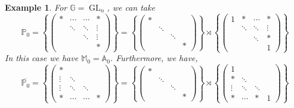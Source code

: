 \documentclass[8pt]{article}
\newtheorem{example}{Example}[section]
\DeclareMathOperator{\GL}{GL}
\newcommand{\A}[0]{\mathbb{A}}
\newcommand{\G}[0]{\mathbb{G}}
\newcommand{\Para}[0]{\mathbb{P}}
\newcommand{\M}[0]{\mathbb{M}}
\begin{document}
\begin{example}
  For $\G=\GL_n$, we can take 
  \begin{equation*}
    \Para_0 = \left\{\begin{pmatrix}
      \ast & \cdots & \cdots & \ast \\
      \: & \ddots& \ddots & \vdots \\
       \: & \:& \ddots & \vdots \\
      \: & \: & \:& \ast
    \end{pmatrix}\right\}
    = \left\{\begin{pmatrix}
      \ast & & \: \: & \: \\
      \: & \ddots & \: &  \: \\
      \: & \: & \ddots & \: \\
      \: & \: & \: & \ast
    \end{pmatrix}\right\}\rtimes
    \left\{\begin{pmatrix}
      1& \ast & \cdots & \ast \\
      \: & \ddots & \ddots&  \vdots \\
      \: & \: & \ddots & \ast \\
      \: & \: & \: & 1
    \end{pmatrix}\right\}
  \end{equation*}
  In this case we have $\M_0=\A_0$. Furthermore, we have,
  \begin{equation*}
   \overline{\Para_0} = \left\{\begin{pmatrix}
      \ast & \: & \:& \: \\
      \vdots & \ddots& \: & \: \\
       \vdots & \ddots& \ddots & \: \\
      \ast & \cdots & \cdots& \ast
    \end{pmatrix}\right\}
    = \left\{\begin{pmatrix}
      \ast & & \: \: & \: \\
      \: & \ddots & \: &  \: \\
      \: & \: & \ddots & \: \\
      \: & \: & \: & \ast
    \end{pmatrix}\right\}\rtimes
    \left\{\begin{pmatrix}
      1& \: & \:& \: \\
      \ast & \ddots & \:&  \:\\
      \vdots &\ddots & \ddots & \: \\
      \ast & \cdots& \ast & 1
    \end{pmatrix}\right\}
  \end{equation*}
\end{example}
\end{document}
